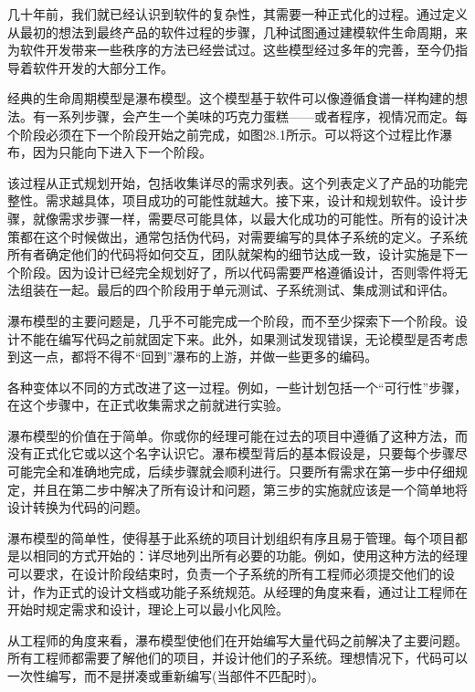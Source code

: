 
几十年前，我们就已经认识到软件的复杂性，其需要一种正式化的过程。通过定义从最初的想法到最终产品的软件过程的步骤，几种试图通过建模软件生命周期，来为软件开发带来一些秩序的方法已经尝试过。这些模型经过多年的完善，至今仍指导着软件开发的大部分工作。


经典的生命周期模型是瀑布模型。这个模型基于软件可以像遵循食谱一样构建的想法。有一系列步骤，会产生一个美味的巧克力蛋糕——或者程序，视情况而定。每个阶段必须在下一个阶段开始之前完成，如图28.1所示。可以将这个过程比作瀑布，因为只能向下进入下一个阶段。


该过程从正式规划开始，包括收集详尽的需求列表。这个列表定义了产品的功能完整性。需求越具体，项目成功的可能性就越大。接下来，设计和规划软件。设计步骤，就像需求步骤一样，需要尽可能具体，以最大化成功的可能性。所有的设计决策都在这个时候做出，通常包括伪代码，对需要编写的具体子系统的定义。子系统所有者确定他们的代码将如何交互，团队就架构的细节达成一致，设计实施是下一个阶段。因为设计已经完全规划好了，所以代码需要严格遵循设计，否则零件将无法组装在一起。最后的四个阶段用于单元测试、子系统测试、集成测试和评估。

瀑布模型的主要问题是，几乎不可能完成一个阶段，而不至少探索下一个阶段。设计不能在编写代码之前就固定下来。此外，如果测试发现错误，无论模型是否考虑到这一点，都将不得不“回到”瀑布的上游，并做一些更多的编码。

各种变体以不同的方式改进了这一过程。例如，一些计划包括一个“可行性”步骤，在这个步骤中，在正式收集需求之前就进行实验。


瀑布模型的价值在于简单。你或你的经理可能在过去的项目中遵循了这种方法，而没有正式化它或以这个名字认识它。瀑布模型背后的基本假设是，只要每个步骤尽可能完全和准确地完成，后续步骤就会顺利进行。只要所有需求在第一步中仔细规定，并且在第二步中解决了所有设计和问题，第三步的实施就应该是一个简单地将设计转换为代码的问题。

瀑布模型的简单性，使得基于此系统的项目计划组织有序且易于管理。每个项目都是以相同的方式开始的：详尽地列出所有必要的功能。例如，使用这种方法的经理可以要求，在设计阶段结束时，负责一个子系统的所有工程师必须提交他们的设计，作为正式的设计文档或功能子系统规范。从经理的角度来看，通过让工程师在开始时规定需求和设计，理论上可以最小化风险。

从工程师的角度来看，瀑布模型使他们在开始编写大量代码之前解决了主要问题。所有工程师都需要了解他们的项目，并设计他们的子系统。理想情况下，代码可以一次性编写，而不是拼凑或重新编写(当部件不匹配时)。

